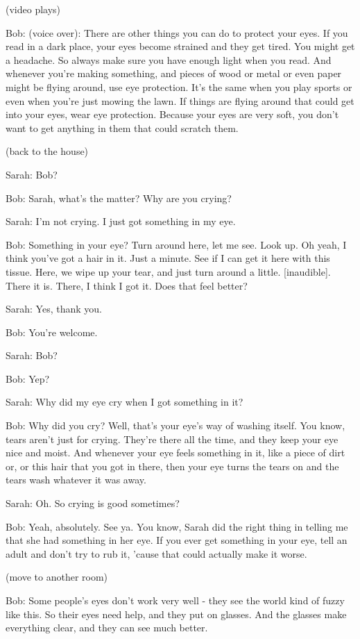 (video plays)

Bob: (voice over): There are other things you can do to protect your eyes. If you read in a dark place, your eyes become strained and they get tired. You might get a headache. So always make sure you have enough light when you read. And whenever you're making something, and pieces of wood or metal or even paper might be flying around, use eye protection. It's the same when you play sports or even when you're just mowing the lawn. If things are flying around that could get into your eyes, wear eye protection. Because your eyes are very soft, you don't want to get anything in them that could scratch them.

(back to the house)

Sarah: Bob?

Bob: Sarah, what's the matter? Why are you crying?

Sarah: I'm not crying. I just got something in my eye.

Bob: Something in your eye? Turn around here, let me see. Look up. Oh yeah, I think you've got a hair in it. Just a minute. See if I can get it here with this tissue. Here, we wipe up your tear, and just turn around a little. [inaudible]. There it is. There, I think I got it. Does that feel better?

Sarah: Yes, thank you.

Bob: You're welcome.

Sarah: Bob?

Bob: Yep?

Sarah: Why did my eye cry when I got something in it?

Bob: Why did you cry? Well, that's your eye's way of washing itself. You know, tears aren't just for crying. They're there all the time, and they keep your eye nice and moist. And whenever your eye feels something in it, like a piece of dirt or, or this hair that you got in there, then your eye turns the tears on and the tears wash whatever it was away.

Sarah: Oh. So crying is good sometimes?

Bob: Yeah, absolutely. See ya. You know, Sarah did the right thing in telling me that she had something in her eye. If you ever get something in your eye, tell an adult and don't try to rub it, 'cause that could actually make it worse.

(move to another room)

Bob: Some people's eyes don't work very well - they see the world kind of fuzzy like this. So their eyes need help, and they put on glasses. And the glasses make everything clear, and they can see much better.

